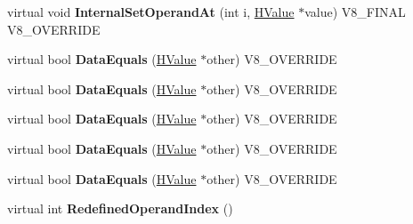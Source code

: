 \begin{DoxyCompactItemize}
\item 
\hypertarget{classv8_1_1internal_1_1_v8___f_i_n_a_l_ad98e2ec783e70d2757d5c873bcb81de8}{}virtual void {\bfseries Internal\+Set\+Operand\+At} (int i, \hyperlink{classv8_1_1internal_1_1_h_value}{H\+Value} $\ast$value) V8\+\_\+\+F\+I\+N\+A\+L V8\+\_\+\+O\+V\+E\+R\+R\+I\+D\+E\label{classv8_1_1internal_1_1_v8___f_i_n_a_l_ad98e2ec783e70d2757d5c873bcb81de8}

\item 
\hypertarget{classv8_1_1internal_1_1_v8___f_i_n_a_l_a7f4d45af1c12067191189fb1f32db617}{}virtual bool {\bfseries Data\+Equals} (\hyperlink{classv8_1_1internal_1_1_h_value}{H\+Value} $\ast$other) V8\+\_\+\+O\+V\+E\+R\+R\+I\+D\+E\label{classv8_1_1internal_1_1_v8___f_i_n_a_l_a7f4d45af1c12067191189fb1f32db617}

\item 
\hypertarget{classv8_1_1internal_1_1_v8___f_i_n_a_l_a7f4d45af1c12067191189fb1f32db617}{}virtual bool {\bfseries Data\+Equals} (\hyperlink{classv8_1_1internal_1_1_h_value}{H\+Value} $\ast$other) V8\+\_\+\+O\+V\+E\+R\+R\+I\+D\+E\label{classv8_1_1internal_1_1_v8___f_i_n_a_l_a7f4d45af1c12067191189fb1f32db617}

\item 
\hypertarget{classv8_1_1internal_1_1_v8___f_i_n_a_l_a7f4d45af1c12067191189fb1f32db617}{}virtual bool {\bfseries Data\+Equals} (\hyperlink{classv8_1_1internal_1_1_h_value}{H\+Value} $\ast$other) V8\+\_\+\+O\+V\+E\+R\+R\+I\+D\+E\label{classv8_1_1internal_1_1_v8___f_i_n_a_l_a7f4d45af1c12067191189fb1f32db617}

\item 
\hypertarget{classv8_1_1internal_1_1_v8___f_i_n_a_l_a7f4d45af1c12067191189fb1f32db617}{}virtual bool {\bfseries Data\+Equals} (\hyperlink{classv8_1_1internal_1_1_h_value}{H\+Value} $\ast$other) V8\+\_\+\+O\+V\+E\+R\+R\+I\+D\+E\label{classv8_1_1internal_1_1_v8___f_i_n_a_l_a7f4d45af1c12067191189fb1f32db617}

\item 
\hypertarget{classv8_1_1internal_1_1_v8___f_i_n_a_l_a7f4d45af1c12067191189fb1f32db617}{}virtual bool {\bfseries Data\+Equals} (\hyperlink{classv8_1_1internal_1_1_h_value}{H\+Value} $\ast$other) V8\+\_\+\+O\+V\+E\+R\+R\+I\+D\+E\label{classv8_1_1internal_1_1_v8___f_i_n_a_l_a7f4d45af1c12067191189fb1f32db617}

\item 
\hypertarget{classv8_1_1internal_1_1_v8___f_i_n_a_l_ae8dec44d4438a5c5137ae8c23a80aa91}{}virtual int {\bfseries Redefined\+Operand\+Index} ()\label{classv8_1_1internal_1_1_v8___f_i_n_a_l_ae8dec44d4438a5c5137ae8c23a80aa91}


\end{DoxyCompactItemize}

